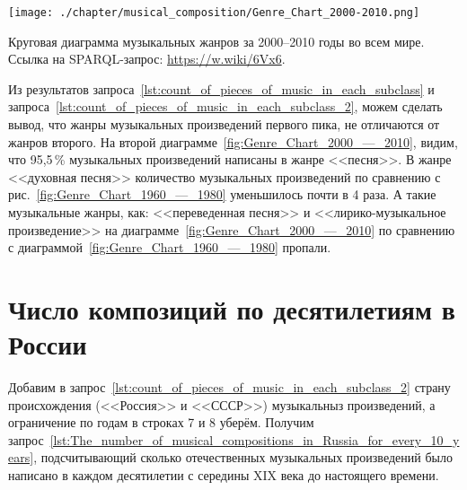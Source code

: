 \begin{marginfigure}[0\baselineskip]
	\texttt{[image: ./chapter/musical\_composition/Genre\_Chart\_2000-2010.png]}
	\caption[Круговая диаграмма музыкальных жанров за 2000--2010 годы во всем мире]{Круговая диаграмма музыкальных жанров за 2000--2010 годы во всем мире. Ссылка на SPARQL-запрос: \href{https://w.wiki/6Vx6}{https://w.wiki/6Vx6}.}%
	\label{fig:Genre_Chart_2000_—_2010}%
\end{marginfigure}

Из результатов запроса~\ref{lst:count_of_pieces_of_music_in_each_subclass} и запроса~\ref{lst:count_of_pieces_of_music_in_each_subclass_2}, можем сделать вывод, что жанры музыкальных произведений первого пика, не отличаются от жанров второго. На второй диаграмме~\ref{fig:Genre_Chart_2000_—_2010}, видим, что 95,5\,\% музыкальных произведений написаны в жанре <<песня>>. В жанре <<духовная песня>> количество музыкальных произведений по сравнению с рис.~\ref{fig:Genre_Chart_1960_—_1980} уменьшилось почти в 4 раза. А такие музыкальные жанры, как: <<переведенная песня>> и <<лирико-музыкальное произведение>> на диаграмме~\ref{fig:Genre_Chart_2000_—_2010} по сравнению с диаграммой~\ref{fig:Genre_Chart_1960_—_1980} пропали.

\section{Число композиций по десятилетиям в России}
Добавим в запрос~\ref{lst:count_of_pieces_of_music_in_each_subclass_2} страну происхождения (<<Россия>> и <<СССР>>) музыкальныз произведений, а ограничение по годам в строках 7 и 8 уберём. Получим запрос~\ref{lst:The_number_of_musical_compositions_in_Russia_for_every_10_years}, подсчитывающий сколько отечественных музыкальных произведений было написано в каждом десятилетии с середины XIX века до настоящего времени.

